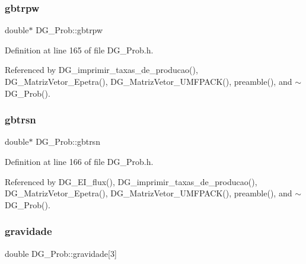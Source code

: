 \subsubsection{\texorpdfstring{gbtrpw}{gbtrpw}}
{\footnotesize\ttfamily double$\ast$ D\+G\+\_\+\+Prob\+::gbtrpw\hspace{0.3cm}{\ttfamily [private]}}



Definition at line 165 of file D\+G\+\_\+\+Prob.\+h.



Referenced by D\+G\+\_\+imprimir\+\_\+taxas\+\_\+de\+\_\+producao(), D\+G\+\_\+\+Matriz\+Vetor\+\_\+\+Epetra(), D\+G\+\_\+\+Matriz\+Vetor\+\_\+\+U\+M\+F\+P\+A\+C\+K(), preamble(), and $\sim$\+D\+G\+\_\+\+Prob().

\mbox{\label{classDG__Prob_a784a71f1e8434f56da43c448cf5b6686}} 
\subsubsection{\texorpdfstring{gbtrsn}{gbtrsn}}
{\footnotesize\ttfamily double$\ast$ D\+G\+\_\+\+Prob\+::gbtrsn\hspace{0.3cm}{\ttfamily [private]}}



Definition at line 166 of file D\+G\+\_\+\+Prob.\+h.



Referenced by D\+G\+\_\+\+E\+I\+\_\+flux(), D\+G\+\_\+imprimir\+\_\+taxas\+\_\+de\+\_\+producao(), D\+G\+\_\+\+Matriz\+Vetor\+\_\+\+Epetra(), D\+G\+\_\+\+Matriz\+Vetor\+\_\+\+U\+M\+F\+P\+A\+C\+K(), preamble(), and $\sim$\+D\+G\+\_\+\+Prob().

\mbox{\label{classDG__Prob_a50341df3061ede25eb1efbef00efb071}} 
\subsubsection{\texorpdfstring{gravidade}{gravidade}}
{\footnotesize\ttfamily double D\+G\+\_\+\+Prob\+::gravidade\mbox{[}3\mbox{]}\hspace{0.3cm}{\ttfamily [private]}}



